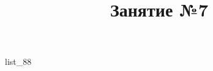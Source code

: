 \documentclass[12pt, a4paper]{article}
\begin{document}
	\title{Занятие №7}
	{list_88}
\end{document}
